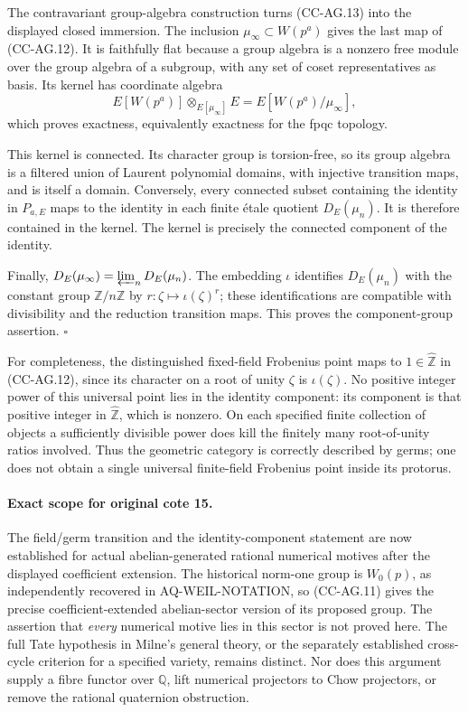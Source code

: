 The contravariant group-algebra construction turns (CC-AG.13)
into the displayed closed immersion. The inclusion
\(\mu_\infty\subset W(p^a)\) gives the last map of (CC-AG.12).
It is faithfully flat because a group algebra is a nonzero free
module over the group algebra of a subgroup, with any set of
coset representatives as basis. Its kernel has coordinate algebra
\[
 E[W(p^a)]\otimes_{E[\mu_\infty]}E
 =E[W(p^a)/\mu_\infty],
\]
which proves exactness, equivalently exactness for the fpqc
topology.

This kernel is connected. Its character group is torsion-free,
so its group algebra is a filtered union of Laurent polynomial
domains, with injective transition maps, and is itself a domain.
Conversely, every connected subset containing the identity in
\(P_{a,E}\) maps to the identity in each finite \'etale quotient
\(D_E(\mu_n)\). It is therefore contained in the kernel.
The kernel is precisely the connected component of the identity.

Finally,
\(D_E(\mu_\infty)=\varprojlim_n D_E(\mu_n)\).
The embedding \(\iota\) identifies
\(D_E(\mu_n)\) with the constant group \(\mathbb Z/n\mathbb Z\)
by \(r:\zeta\mapsto\iota(\zeta)^r\); these identifications are
compatible with divisibility and the reduction transition maps.
This proves the component-group assertion. \(\square\)

For completeness, the distinguished fixed-field Frobenius point
maps to \(1\in\widehat{\mathbb Z}\) in (CC-AG.12), since its
character on a root of unity \(\zeta\) is \(\iota(\zeta)\).
No positive integer power of this universal point lies in the
identity component: its component is that positive integer in
\(\widehat{\mathbb Z}\), which is nonzero. On each specified
finite collection of objects a sufficiently divisible power
does kill the finitely many root-of-unity ratios involved.
Thus the geometric category is correctly described by germs;
one does not obtain a single universal finite-field Frobenius
point inside its protorus.

\paragraph{Exact scope for original cote 15.}
The field/germ transition and the identity-component statement
are now established for actual abelian-generated rational numerical
motives after the displayed coefficient extension. The historical
norm-one group is \(W_0(p)\), as independently recovered in
AQ-WEIL-NOTATION, so (CC-AG.11) gives the precise coefficient-extended
abelian-sector version of its proposed group.
The assertion that \emph{every} numerical motive lies in this sector
is not proved here. The full Tate hypothesis in Milne's general
theory, or the separately established cross-cycle criterion for a
specified variety, remains distinct. Nor does this argument supply
a fibre functor over \(\mathbb Q\), lift numerical projectors to
Chow projectors, or remove the rational quaternion obstruction.

